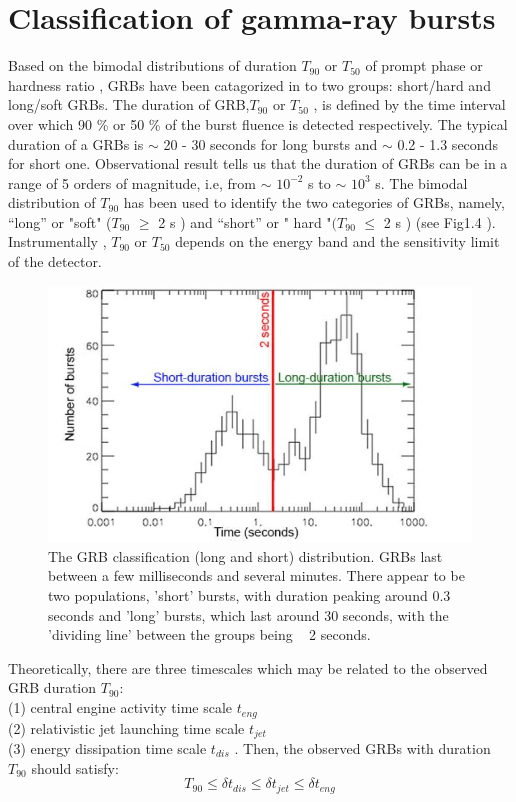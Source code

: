 \section{Classification of gamma-ray bursts}
Based on the bimodal distributions of duration $ T_{90}$ or $ T_{50}$ of prompt phase or hardness ratio , GRBs have been catagorized in to two groups: short/hard and long/soft GRBs. The duration of GRB,$ T_{90} $ or $ T_{50}$  , is defined by the time interval over which 90 \%  or  50 \%  of the burst fluence is detected respectively. The typical duration of a GRBs is $\sim $ 20 - 30  seconds for long bursts and $\sim $ 0.2 - 1.3 seconds for short one. Observational result tells us that the duration of GRBs can be in a range of 5 orders of magnitude, i.e, from $\sim $ $ 10^{-2} $ s  to $\sim $ $ 10^{3} $ s. The bimodal distribution of $ T_{90} $ has been used to identify the two categories of GRBs, namely, “long” or "soft" ($ T_{90}$ $\geqslant $ 2  s ) and “short” or " hard "$( T_{90}$   $\leqslant$ 2 s ) (see Fig1.4 ). Instrumentally ,  $T_{90}$  or  $T_{50} $ depends on the energy band and the sensitivity limit of the detector.
\begin{figure}[h]
\begin{center}
\includegraphics[scale=0.4]{Figures/fig4.png}
\caption{The GRB classification (long and short) distribution. GRBs last between a few milliseconds and several minutes. There appear to be two populations, 'short' bursts, with duration peaking around 0.3 seconds and 'long' bursts, which last around 30 seconds, with the 'dividing line' between the groups being ~ 2 seconds. }
\end{center}
\end{figure} 
Theoretically, there are three timescales which may be related to the observed GRB duration $ T_{90} $:\\
(1) central engine activity time scale $t_{eng}$\\
(2) relativistic jet launching time scale $t_{jet} $\\
(3) energy dissipation time scale $t_{dis}$ . Then, the observed GRBs with duration $  T_{90}$ should satisfy: \citep{5}
\begin{equation}
T_{90} \leq \delta  t_{dis} \leq\delta t_{jet} \leq \delta t_{eng} 
\end{equation}
